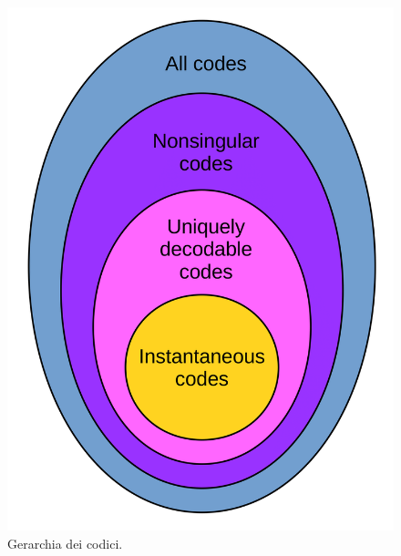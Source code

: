 \begin{minipage}{0.45\textwidth}
\begin{figure}[H]
\includegraphics[scale=0.2]{img/codes.png}
\caption{\label{fig:codes} Gerarchia dei codici.}
\end{figure}
\end{minipage}
